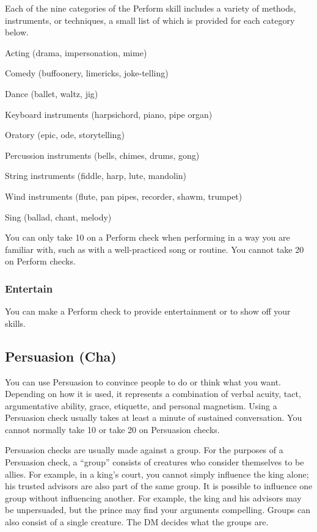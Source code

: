 Each of the nine categories of the Perform skill includes a variety of methods, instruments, or techniques, a small list of which is provided for each category below.
\begin{itemize*}
\item Acting (drama, impersonation, mime)
\item Comedy (buffoonery, limericks, joke-telling)
\item Dance (ballet, waltz, jig)
\item Keyboard instruments (harpsichord, piano, pipe organ)
\item Oratory (epic, ode, storytelling)
\item Percussion instruments (bells, chimes, drums, gong)
\item String instruments (fiddle, harp, lute, mandolin)
\item Wind instruments (flute, pan pipes, recorder, shawm, trumpet)
\item Sing (ballad, chant, melody)
\end{itemize*}

You can only take 10 on a Perform check when performing in a way you are familiar with, such as with a well-practiced song or routine. You cannot take 20 on Perform checks.

\subsubsection{Entertain}
You can make a Perform check to provide entertainment or to show off your skills.

\subsection{Persuasion (Cha)}
You can use Persuasion to convince people to do or think what you want. Depending on how it is used, it represents a combination of verbal acuity, tact, argumentative ability, grace, etiquette, and personal magnetism. Using a Persuasion check usually takes at least a minute of sustained conversation. You cannot normally take 10 or take 20 on Persuasion checks.

Persuasion checks are usually made against a group. For the purposes of a Persuasion check, a ``group'' consists of creatures who consider themselves to be allies. For example, in a king's court, you cannot simply influence the king alone; his trusted advisors are also part of the same group. It is possible to influence one group without influencing another. For example, the king and his advisors may be unpersuaded, but the prince may find your arguments compelling. Groups can also consist of a single creature. The DM decides what the groups are.

